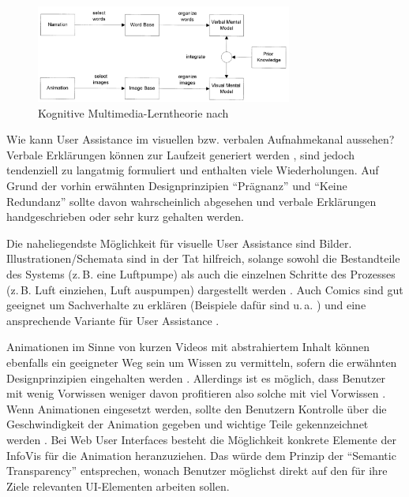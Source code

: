 \documentclass[
	headsepline,
	footsepline,
	fontsize=12pt,
	bibliography=totoc
]{scrbook}
\begin{document}
\begin{figure}[htbp]
   \centering
   \includegraphics[width=0.75\textwidth]{images/grundlagen-kognitive_multimedia_lerntheorie.png}
   \caption{Kognitive Multimedia-Lerntheorie nach \cite{Mayer2002}}
   \label{figure:kognitive_multimedia_lerntheorie}
\end{figure}


Wie kann User Assistance im visuellen bzw. verbalen Aufnahmekanal aussehen? Verbale Erklärungen können zur Laufzeit generiert werden \cite{Bauer2011, Gesell2012, Matheson2012}, sind jedoch tendenziell zu langatmig formuliert und enthalten viele Wiederholungen. Auf Grund der vorhin erwähnten Designprinzipien \enquote{Prägnanz} und \enquote{Keine Redundanz} sollte davon wahrscheinlich abgesehen und verbale Erklärungen handgeschrieben oder sehr kurz gehalten werden.

Die naheliegendste Möglichkeit für visuelle User Assistance sind Bilder. Illustrationen/Schemata sind in der Tat hilfreich, solange sowohl die Bestandteile des Systems (z.\,B. eine Luftpumpe) als auch die einzelnen Schritte des Prozesses (z.\,B. Luft einziehen, Luft auspumpen) dargestellt werden \cite{Mayer1990}. Auch Comics sind gut geeignet um Sachverhalte zu erklären (Beispiele dafür sind u.\,a. \cite{McCloud1994, McCloud2008}) und eine ansprechende Variante für User Assistance \cite{Webb2012}.

Animationen im Sinne von kurzen Videos mit abstrahiertem Inhalt können ebenfalls ein geeigneter Weg sein um Wissen zu vermitteln, sofern die erwähnten Designprinzipien eingehalten werden \cite{Mayer2002a}. Allerdings ist es möglich, dass Benutzer mit wenig Vorwissen weniger davon profitieren also solche mit viel Vorwissen \cite{Kalyuga2008}. Wenn Animationen eingesetzt werden, sollte den Benutzern Kontrolle über die Geschwindigkeit der Animation gegeben und wichtige Teile gekennzeichnet werden \cite{Wong2011}. Bei Web User Interfaces besteht die Möglichkeit konkrete Elemente der InfoVis für die Animation heranzuziehen. Das würde dem Prinzip der \enquote{Semantic Transparency} \cite{Kohlhase2009} entsprechen, wonach Benutzer möglichst direkt auf den für ihre Ziele relevanten UI-Elementen arbeiten sollen.
\end{document}
